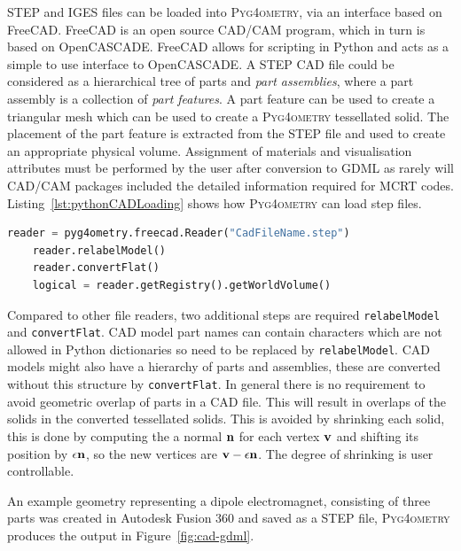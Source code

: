 \documentclass[final,5p,times,twocolumn]{elsarticle}
\newcommand{\pyinline}[1]{\lstinline[postbreak={}]{#1}}
\newcommand{\PYGEOMETRY}{\textsc{Pyg4ometry}}
\begin{document}
STEP and IGES files can be loaded into \PYGEOMETRY{}, via an interface 
based on FreeCAD. FreeCAD is an open source CAD/CAM program, which 
in turn is based on OpenCASCADE. FreeCAD allows for scripting in Python 
and acts as a simple to use interface to OpenCASCADE.  A STEP CAD file 
could be considered as a hierarchical tree of parts and \emph{part assemblies}, 
where a part assembly is a collection of \emph{part features}. A part feature can be used 
to create a triangular mesh which can be used to create a \PYGEOMETRY{} tessellated solid. The placement 
of the part feature is extracted from the STEP file and used to create an 
appropriate physical volume. Assignment of materials and visualisation 
attributes must be performed by  the user after conversion to GDML as rarely 
will CAD/CAM packages included the detailed information required for MCRT 
codes. Listing~\ref{lst:pythonCADLoading} shows 
how \PYGEOMETRY{} can load step files.
\begin{lstlisting}[caption={A simple \PYGEOMETRY{} Python script to load a STEP file.},label={lst:pythonCADLoading}, language=Python]
    reader = pyg4ometry.freecad.Reader("CadFileName.step")
    reader.relabelModel()
    reader.convertFlat()
    logical = reader.getRegistry().getWorldVolume()
\end{lstlisting}
Compared to other file readers, two additional steps are required \pyinline{relabelModel} and \pyinline{convertFlat}. CAD model 
part names can contain characters which are not allowed in Python dictionaries so need to be replaced by \pyinline{relabelModel}. 
CAD models might also have a hierarchy of parts and assemblies, these are converted without this structure by \pyinline{convertFlat}.
In general there is no requirement to avoid geometric overlap  of parts in a CAD file. This will result in overlaps of the solids in 
the converted tessellated solids. This is avoided by shrinking each solid, this is done by computing the a normal ${\bf n}$  for each 
vertex ${\bf v}$ and shifting its position by $\epsilon {\bf n}$, so the new vertices are ${\bf v} - \epsilon {\bf n}$. The degree of shrinking 
is user controllable. 

An example geometry representing a dipole electromagnet, consisting of three parts was created in Autodesk Fusion 360
and saved as a STEP file, \PYGEOMETRY{} produces the output in Figure~\ref{fig:cad-gdml}.
\end{document}
